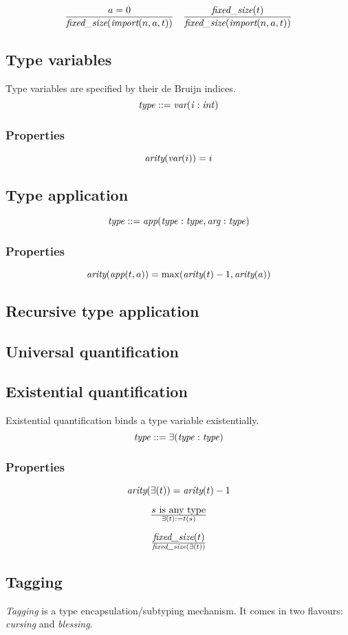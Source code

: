 \documentclass[a4paper]{report}
\newcommand\arity{{\ensuremath\textit{arity}}}
\newcommand\fixedsize{{\ensuremath\textit{fixed\_size}}}
\newcommand\tyImport{{\ensuremath\textit{import}}}
\newcommand\tyVar{{\ensuremath\textit{var}}}
\newcommand\tyApp{{\ensuremath\textit{app}}}
\begin{document}
$$
{a=0 \over \fixedsize(\tyImport(n, a, t))}
\quad
{\fixedsize(t) \over \fixedsize(\tyImport(n, a, t))}
$$


\subsection{Type variables}
Type variables are specified by their de Bruijn indices.
$$
\it type ::= \tyVar(i : int)
$$

\subsubsection*{Properties}
$$\arity(\tyVar(i)) = i$$

\subsection{Type application}
$$
\it type ::= \tyApp(type : type, arg : type)
$$
\subsubsection*{Properties}
$$ \arity(\tyApp(t,a)) = \max(\arity(t)-1, \arity(a)) $$

\subsection{Recursive type application}
\subsection{Universal quantification}
\subsection{Existential quantification}
Existential quantification binds a type variable existentially.
$$ \it type ::= \exists(type : type) $$

\subsubsection*{Properties}
$$ \arity(\exists(t)) = \arity(t)-1 $$

$${s \textrm{ is any type}} \over \exists(t) := t(s)$$

$$\fixedsize(t) \over \fixedsize(\exists(t))$$

\subsection{Tagging}
\emph{Tagging} is a type encapsulation/subtyping mechanism.
It comes in two flavours: \emph{cursing} and \emph{blessing}.
\end{document}
